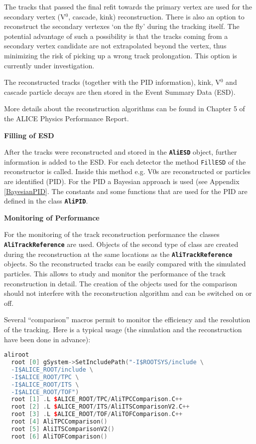\documentclass[12pt,a4paper,twoside]{article}
\newcommand{\class}[1]{\texttt{\textbf{#1}}\xspace}
\newcommand{\method}[1]{\texttt{#1}\xspace}
\begin{document}
The tracks that passed the final refit towards the primary vertex are used
for the secondary vertex (V$^0$, cascade, kink) reconstruction.  There is also
an option to reconstruct the secondary vertexes `on the fly' during the
tracking itself. The potential advantage of such a possibility is that
the tracks coming from a secondary vertex candidate are not extrapolated
beyond the vertex, thus minimizing the risk of picking up a wrong track
prolongation.  This option is currently under investigation.

The reconstructed tracks (together with the PID information), kink, V$^0$  
and cascade particle decays are then stored in the Event Summary Data (ESD). 

More details about the reconstruction algorithms can be found in
Chapter 5 of the ALICE Physics Performance Report\cite{PPRVII}.

\noindent
\textbf{Filling of ESD}

After the tracks were reconstructed and stored in the \class{AliESD} object,
further information is added to the ESD. For each detector the method
\method{FillESD} of the reconstructor is called. Inside this method e.g. V0s
are reconstructed or particles are identified (PID). For the PID a
Bayesian approach is used (see Appendix \ref{BayesianPID}. The constants
and some functions that are used for the PID are defined in the class
\class{AliPID}.


\textbf{Monitoring of Performance}

For the monitoring of the track reconstruction performance the classes
\class{AliTrackReference} are used. 
Objects of the second type of class are created during the
reconstruction at the same locations as the \class{AliTrackReference}
objects. 
So the reconstructed tracks can be easily compared with the simulated
particles. 
This allows to study and monitor the performance of the track reconstruction in detail.
The creation of the objects used for the comparison should not
interfere with the reconstruction algorithm and can be switched on or
off. 

Several ``comparison'' macros permit to monitor the efficiency and the
resolution of the tracking. Here is a typical usage (the simulation
and the reconstruction have been done in advance):

\begin{lstlisting}[language=C++]
  aliroot
  root [0] gSystem->SetIncludePath("-I$ROOTSYS/include \
  -I$ALICE_ROOT/include \
  -I$ALICE_ROOT/TPC \
  -I$ALICE_ROOT/ITS \
  -I$ALICE_ROOT/TOF")
  root [1] .L $ALICE_ROOT/TPC/AliTPCComparison.C++
  root [2] .L $ALICE_ROOT/ITS/AliITSComparisonV2.C++
  root [3] .L $ALICE_ROOT/TOF/AliTOFComparison.C++
  root [4] AliTPCComparison()
  root [5] AliITSComparisonV2()
  root [6] AliTOFComparison()
\end{lstlisting}
\end{document}
